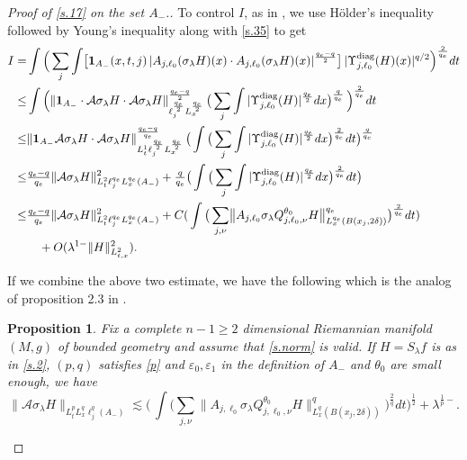 \documentclass[10pt]{amsart}
\newtheorem{proposition}[theorem]{Proposition}
\newcommand{\la}{\lambda}
\newcommand{\e}{\varepsilon}
\newcommand{\1}{{\bf 1}}
\newcommand{\A}{{\mathcal A}}
\newcommand{\diag}{\Upsilon^{\text{diag}}}
\begin{document}
\begin{proof}[Proof of \eqref{s.17} on the set $A_-$.]
To control $I$, as in \cite{HSst},  we
use H\"older's inequality followed by Young's 
inequality along with \eqref{s.35} to get
\begin{equation}
    \begin{aligned}
        I=&
\int \Big(\sum_j \int 
\bigl[ \1_{A_-}(x,t,j) \, |A_{j,\ell_0}(\sigma_\la H)(x) \cdot A_{j,\ell_0}(\sigma_\la H)(x)|^{\frac{q_e-q}2}
\bigr] \, |\diag_{j,\ell_0}(H)(x)|^{q/2}\Big)^{\frac2{q_e}}dt\\
\le & \int\Big( \|\1_{A_-}\cdot \A \sigma_\la H \cdot
 \A \sigma_\la H\|_{\ell_j^{\frac{q_e}{2}}L_x^{\frac{q_e}{2}}}^{\frac{q_e-q}2} \, 
 \big(\sum_j \int|\diag_{j,\ell_0}(H)|^{\frac{q_e}{2}}dx\big)^{\frac{q}{q_e}}\,\Big)^{\frac{2}{q_e}}dt \\
\le &\| \1_{A_-}\A \sigma_\la H \cdot
 \A \sigma_\la H\|_{L^1_t\ell_j^{\frac{q_e}{2}}L_x^{\frac{q_e}{2}}}^{\frac{q_e-q}{q_e}} \, 
\big( \int \big(\sum_j \int|\diag_{j,\ell_0}(H)|^{\frac{q_e}{2}}dx\big)^{\frac{2}{q_e}} dt \big)^{\frac{q}{q_e}} \\
\le &\tfrac{q_e-q}{q_e}\| \A \sigma_\la H \|^2_{L^2_t\ell_j^{q_e}L_x^{q_e}(A_-)} +\tfrac{q}{q_e}
\big( \int \big(\sum_j \int|\diag_{j,\ell_0}(H)|^{\frac{q_e}{2}}dx\big)^{\frac{2}{q_e}} dt \big)\\
\le &\tfrac{q_e-q}{q_e}\| \A \sigma_\la H \|^2_{L^2_t\ell_j^{q_e}L_x^{q_e}(A_-)} +C(\,\int \big(\sum_{j,\nu}\bigl\| A_{j,\ell_0}\sigma_\la Q^{\theta_0}_{j,\ell_0,\nu} H\bigr\|^{q_e}_{L^{q_e}_x(B(x_j,2\delta))}\big)^{\frac{2}{q_e}}dt)\\
&\quad+O(\la^{1-}\|H\|^2_{L^2_{t,x}}).
    \end{aligned}
\end{equation}


If we combine the above two estimate, we have the following which is the analog of proposition 2.3 in \cite{HSst}.
\begin{proposition}\label{locprop}
Fix a complete $n-1\ge 2$ dimensional Riemannian manifold $(M,g)$ of bounded geometry and assume that \eqref{s.norm} is valid.
If $H=S_\la f$ is as in \eqref{s.2}, $(p,q)$ satisfies \eqref{p} and $\e_0,\e_1$ in the definition of $A_-$ and $\theta_0$ are small enough, we have
\begin{equation}\label{s.40}
\|\A \sigma_\la H\|_{L^{p}_tL^{q}_x\ell_j^q(A_-)}
\lesssim \big(\,\int \big(\sum_{j,\nu}\bigl\| A_{j,\ell_0}\sigma_\la Q^{\theta_0}_{j,\ell_0,\nu} H\bigr\|^{q}_{L^{q}_x(B(x_j,2\delta))}\big)^{\frac{2}{q}}dt\big)^{\frac12}
+\la^{\frac1{p}-}.
\end{equation}
\end{proposition}



\end{proof}
\end{document}
